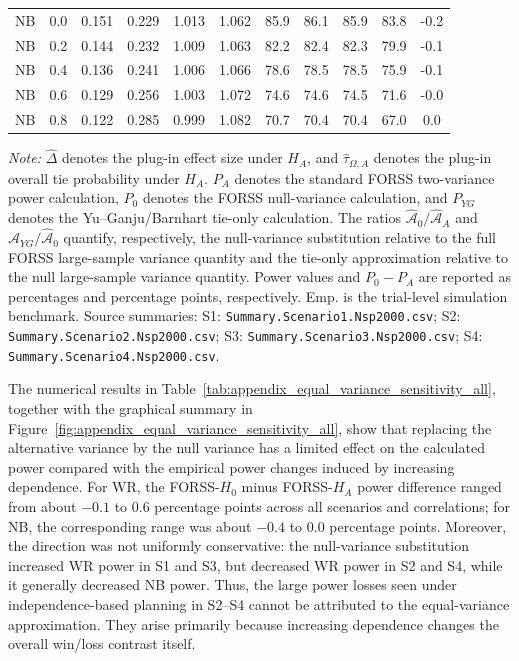 \begin{table}[p]
\begin{tabular}{@{}ccccccccccc@{}}
NB & 0.0 & 0.151 & 0.229 & 1.013 & 1.062 & 85.9 & 86.1 & 85.9 & 83.8 & -0.2 \\
NB & 0.2 & 0.144 & 0.232 & 1.009 & 1.063 & 82.2 & 82.4 & 82.3 & 79.9 & -0.1 \\
NB & 0.4 & 0.136 & 0.241 & 1.006 & 1.066 & 78.6 & 78.5 & 78.5 & 75.9 & -0.1 \\
NB & 0.6 & 0.129 & 0.256 & 1.003 & 1.072 & 74.6 & 74.6 & 74.5 & 71.6 & -0.0 \\
NB & 0.8 & 0.122 & 0.285 & 0.999 & 1.082 & 70.7 & 70.4 & 70.4 & 67.0 & 0.0 \\
\bottomrule
\end{tabular}
\parbox{0.96\textwidth}{\footnotesize \textit{Note:} $\widehat{\Delta}$ denotes the plug-in effect size under $H_A$, and $\widehat{\tau}_{\Omega,A}$ denotes the plug-in overall tie probability under $H_A$. $P_A$ denotes the standard FORSS two-variance power calculation, $P_0$ denotes the FORSS null-variance calculation, and $P_{YG}$ denotes the Yu--Ganju/Barnhart tie-only calculation. The ratios $\widehat{\mathcal A}_0/\widehat{\mathcal A}_A$ and $\widehat{\mathcal A}_{YG}/\widehat{\mathcal A}_0$ quantify, respectively, the null-variance substitution relative to the full FORSS large-sample variance quantity and the tie-only approximation relative to the null large-sample variance quantity. Power values and $P_0-P_A$ are reported as percentages and percentage points, respectively. Emp. is the trial-level simulation benchmark. Source summaries: S1: \texttt{Summary.Scenario1.Nsp2000.csv}; S2: \texttt{Summary.Scenario2.Nsp2000.csv}; S3: \texttt{Summary.Scenario3.Nsp2000.csv}; S4: \texttt{Summary.Scenario4.Nsp2000.csv}.}
\end{table}

The numerical results in Table~\ref{tab:appendix_equal_variance_sensitivity_all}, together with the graphical summary in Figure~\ref{fig:appendix_equal_variance_sensitivity_all}, show that replacing the alternative variance by the null variance has a limited effect on the calculated power compared with the empirical power changes induced by increasing dependence. For WR, the FORSS-$H_0$ minus FORSS-$H_A$ power difference ranged from about $-0.1$ to 0.6 percentage points across all scenarios and correlations; for NB, the corresponding range was about $-0.4$ to 0.0 percentage points. Moreover, the direction was not uniformly conservative: the null-variance substitution increased WR power in S1 and S3, but decreased WR power in S2 and S4, while it generally decreased NB power. Thus, the large power losses seen under independence-based planning in S2--S4 cannot be attributed to the equal-variance approximation. They arise primarily because increasing dependence changes the overall win/loss contrast itself.

